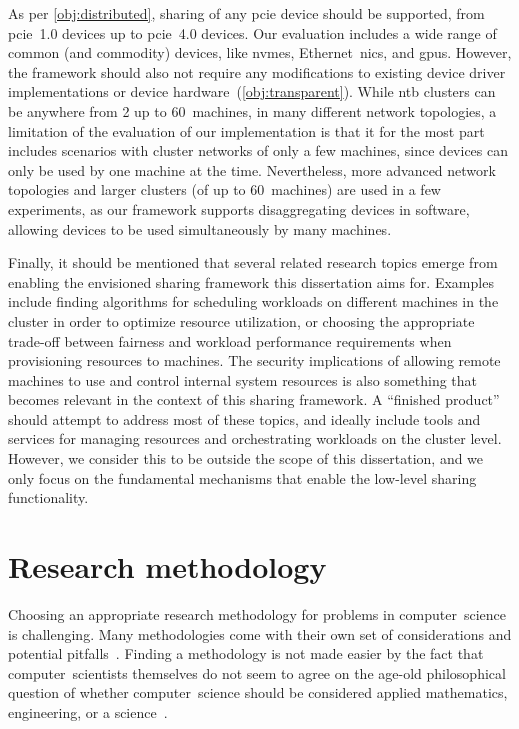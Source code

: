 As per \cref{obj:distributed}, sharing of any \gls{pcie} device should be supported, from \gls{pcie}~1.0 devices up to \gls{pcie}~4.0 devices.
%
Our evaluation includes a wide range of common (and commodity) devices, like \glspl{nvme}, Ethernet~\glspl{nic}, and \glspl{gpu}.
%
However, the framework should also not require any modifications to existing device driver implementations or device hardware~(\cref{obj:transparent}).
%
While \gls{ntb} clusters can be anywhere from 2 up to 60~machines, in many different network topologies, a limitation of the evaluation of our implementation is that it for the most part includes scenarios with cluster networks of only a few machines, since devices can only be used by one machine at the time.
%
Nevertheless, more advanced network topologies and larger clusters (of up to 60~machines) are used in a few experiments, as our framework supports \gls{disaggregating} devices in software, allowing devices to be used simultaneously by many machines.



Finally, it should be mentioned that several related research topics emerge from enabling the envisioned sharing framework this dissertation aims for.
%
Examples include finding algorithms for scheduling workloads on different machines in the cluster in order to optimize resource utilization, or choosing the appropriate trade-off between fairness and workload performance requirements when provisioning resources to machines.
%
The security implications of allowing remote machines to use and control internal system resources is also something that becomes relevant in the context of this sharing framework.
%
A ``finished product'' should attempt to address most of these topics, and ideally include tools and services for managing resources and orchestrating workloads on the cluster level.
%
However, we consider this to be outside the scope of this dissertation, and we only focus on the fundamental mechanisms that enable the low-level sharing functionality.



\section{Research methodology}\label{sec:methodology}
Choosing an appropriate research methodology for problems in computer~science is challenging.
%
Many methodologies come with their own set of considerations and potential pitfalls~\cite{McGrath1981}.
%
Finding a methodology is not made easier by the fact that computer~scientists themselves do not seem to agree on the age-old philosophical question of whether computer~science should be considered applied mathematics, engineering, or a science~\cite{Denning2005}.


